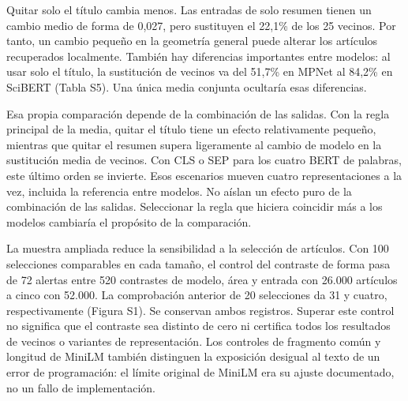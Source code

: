 \documentclass[12pt]{article}
\begin{document}

Quitar solo el título cambia menos. Las entradas de solo resumen tienen un cambio medio de forma de 0,027, pero sustituyen el 22,1\% de los 25 vecinos. Por tanto, un cambio pequeño en la geometría general puede alterar los artículos recuperados localmente. También hay diferencias importantes entre modelos: al usar solo el título, la sustitución de vecinos va del 51,7\% en MPNet al 84,2\% en SciBERT (Tabla S5). Una única media conjunta ocultaría esas diferencias.

Esa propia comparación depende de la combinación de las salidas. Con la regla principal de la media, quitar el título tiene un efecto relativamente pequeño, mientras que quitar el resumen supera ligeramente al cambio de modelo en la sustitución media de vecinos. Con CLS o SEP para los cuatro BERT de palabras, este último orden se invierte. Esos escenarios mueven cuatro representaciones a la vez, incluida la referencia entre modelos. No aíslan un efecto puro de la combinación de las salidas. Seleccionar la regla que hiciera coincidir más a los modelos cambiaría el propósito de la comparación.

La muestra ampliada reduce la sensibilidad a la selección de artículos. Con 100 selecciones comparables en cada tamaño, el control del contraste de forma pasa de 72 alertas entre 520 contrastes de modelo, área y entrada con 26.000 artículos a cinco con 52.000. La comprobación anterior de 20 selecciones da 31 y cuatro, respectivamente (Figura S1). Se conservan ambos registros. Superar este control no significa que el contraste sea distinto de cero ni certifica todos los resultados de vecinos o variantes de representación. Los controles de fragmento común y longitud de MiniLM también distinguen la exposición desigual al texto de un error de programación: el límite original de MiniLM era su ajuste documentado, no un fallo de implementación.
\end{document}
